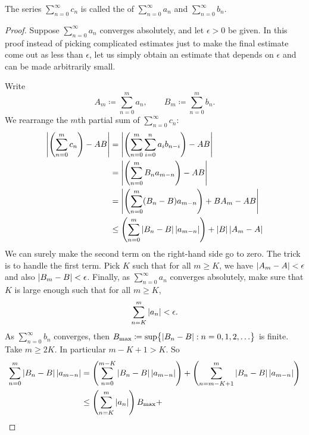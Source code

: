 The series $\sum_{n=0}^\infty c_n$ is called the \emph{} of
$\sum_{n=0}^\infty a_n$ and $\sum_{n=0}^\infty b_n$.

\begin{proof}
Suppose $\sum_{n=0}^\infty a_n$ converges absolutely, and let $\epsilon > 0$ be
given.
In this proof instead of picking complicated estimates just to make
the final estimate come out as less than $\epsilon$,
let us simply obtain an estimate that depends on $\epsilon$
and can be made arbitrarily small.

Write
\begin{equation*}
A_m \coloneqq \sum_{n=0}^m a_n , \qquad B_m \coloneqq \sum_{n=0}^m b_n .
\end{equation*}
We rearrange the $m$th partial sum of $\sum_{n=0}^\infty c_n$:
\begin{equation*}
\begin{split}
\left\lvert {\left(\sum_{n=0}^m c_n \right) - AB} \right\rvert
& =
\left\lvert {\left( \sum_{n=0}^m \sum_{i=0}^n a_i b_{n-i} \right) - AB} \right\rvert
\\
& =
\left\lvert {\left( \sum_{n=0}^m
  B_n a_{m-n} \right) - AB} \right\rvert
\\
& =
\left\lvert {\left( \sum_{n=0}^m
  ( B_n -  B ) a_{m-n} \right)
    + B A_m - AB} \right\rvert
\\
& \leq
\left(
\sum_{n=0}^m
  \left\lvert { B_n -  B } \right\rvert \left\lvert {a_{m-n}} \right\rvert
\right)
+
\left\lvert {B} \right\rvert\left\lvert {A_m - A} \right\rvert
\end{split}
\end{equation*}
We can surely make the second term on the right-hand side go to zero.
The trick is to handle the first term.
Pick $K$ such that for all $m \geq K$, we have 
$\left\lvert {A_m - A} \right\rvert < \epsilon$ and
also
$\left\lvert {B_m - B} \right\rvert < \epsilon$.  Finally,
as $\sum_{n=0}^\infty a_n$ converges absolutely,
make sure that $K$ is large enough such that
for all $m \geq K$,
\begin{equation*}
\sum_{n=K}^m \left\lvert {a_n} \right\rvert < \epsilon .
\end{equation*}
As $\sum_{n=0}^\infty b_n$ converges, then
$B_{\text{max}} \coloneqq \sup \bigl\{ \left\lvert { B_n - B } \right\rvert : n = 0,1,2,\ldots
\bigr\}$
is finite.  Take $m \geq 2K$.
In particular $m-K+1 > K$.  So
\begin{equation*}
\begin{split}
\sum_{n=0}^m
  \abs{ B_n -  B } \abs{a_{m-n}}
& =
\left(
\sum_{n=0}^{m-K}
  \abs{ B_n -  B } \abs{a_{m-n}}
\right)
+
\left(
\sum_{n=m-K+1}^m
  \abs{ B_n -  B } \abs{a_{m-n}}
\right)
\\
& \leq
\left(
\sum_{n=K}^m
\abs{a_{n}}
\right)
B_{\text{max}}
+

\end{split}
\end{equation*}
\end{proof}
